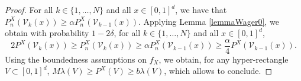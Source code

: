 \documentclass[paper=a4, fontsize=11pt]{scrartcl}
\begin{document}
\begin{proof}
For all $k\in \{1,\ldots, N\}$ and all $x\in [0,1]^d$, we have that $P_n^X(\mathcal V_k(x)) \geq \alpha P_n^X(\mathcal{V}_{k-1}(x))$. 
Applying Lemma \ref{lemmaWager0}, we obtain with probability $1-2\delta $, 
for all $k\in \{1,\ldots, N\}$ and all $x\in [0,1]^d$,
$$ 2 P^X(\mathcal V_k(x)) \geq P_n^X(\mathcal V_k(x)) \geq \alpha P_n^X(\mathcal{V}_{k-1}(x)) \geq \frac{\alpha }{4} P^X(\mathcal V_{k-1}(x)).$$
Using the boundedness assumptions on $f_X$, we obtain, for any hyper-rectangle $V\subset [0,1]^d$, $M \lambda(V) \geq  P^X(V ) \geq b \lambda(V)$, which allows to conclude.

\end{proof}
\end{document}
